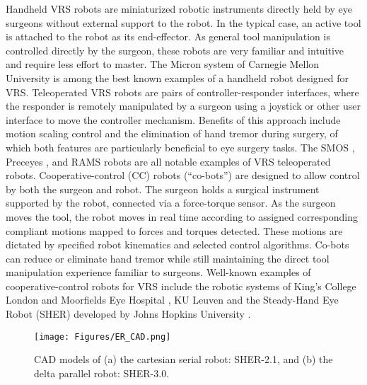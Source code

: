 \documentclass[letterpaper, 10 pt, conference]{ieeeconf}  %
\begin{document}
Handheld VRS robots are miniaturized robotic instruments directly held by eye surgeons without external support to the robot. In the typical case, an active tool is attached to the robot as its end-effector. As general tool manipulation is controlled directly by the surgeon, these robots are very familiar and intuitive and require less effort to master. The Micron system of Carnegie Mellon University \cite{yang2014manipulator} is among the best known examples of a handheld robot designed for VRS.
Teleoperated VRS robots are pairs of controller-responder interfaces, where the responder is remotely manipulated by a surgeon using a joystick or other user interface to move the controller mechanism. Benefits of this approach include motion scaling control and the elimination of hand tremor during surgery, of which both features are particularly beneficial to eye surgery tasks. The SMOS \cite{guerrouad1989smos}, Preceyes \cite{meenink2013robot}, and RAMS \cite{nasseri2013introduction} robots are all notable examples of VRS teleoperated robots. 
Cooperative-control (CC) robots (“co-bots”) are designed to allow control by both the surgeon and robot. The surgeon holds a surgical instrument supported by the robot, connected via a force-torque sensor. As the surgeon moves the tool, the robot moves in real time according to assigned corresponding compliant motions mapped to forces and torques detected. These motions are dictated by specified robot kinematics and selected control algorithms. Co-bots can reduce or eliminate hand tremor while still maintaining the direct tool manipulation experience familiar to surgeons. Well-known examples of cooperative-control robots for VRS include the robotic systems of King’s College London and Moorfields Eye Hospital \cite{mablekos2018requirements}, KU Leuven \cite{gijbels2013design} and the Steady-Hand Eye Robot (SHER) developed by Johns Hopkins University \cite{he2012toward}.

\begin{figure}[b!]
  \centering
    \texttt{[image: Figures/ER\_CAD.png]}
      \caption{CAD models of (a) the cartesian serial robot: SHER-2.1, and (b) the delta parallel robot: SHER-3.0.}
      \label{fig: ER_CAD}
\end{figure}
\end{document}
